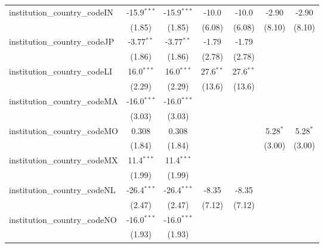 \begin{tabular}{lcccccc}
   institution\_country\_codeIN          & -15.9$^{***}$ & -15.9$^{***}$ & -10.0         & -10.0         & -2.90         & -2.90\\   
                                         & (1.85)        & (1.85)        & (6.08)        & (6.08)        & (8.10)        & (8.10)\\   
   institution\_country\_codeJP          & -3.77$^{**}$  & -3.77$^{**}$  & -1.79         & -1.79         &               &   \\   
                                         & (1.86)        & (1.86)        & (2.78)        & (2.78)        &               &   \\   
   institution\_country\_codeLI          & 16.0$^{***}$  & 16.0$^{***}$  & 27.6$^{**}$   & 27.6$^{**}$   &               &   \\   
                                         & (2.29)        & (2.29)        & (13.6)        & (13.6)        &               &   \\   
   institution\_country\_codeMA          & -16.0$^{***}$ & -16.0$^{***}$ &               &               &               &   \\   
                                         & (3.03)        & (3.03)        &               &               &               &   \\   
   institution\_country\_codeMO          & 0.308         & 0.308         &               &               & 5.28$^{*}$    & 5.28$^{*}$\\   
                                         & (1.84)        & (1.84)        &               &               & (3.00)        & (3.00)\\   
   institution\_country\_codeMX          & 11.4$^{***}$  & 11.4$^{***}$  &               &               &               &   \\   
                                         & (1.99)        & (1.99)        &               &               &               &   \\   
   institution\_country\_codeNL          & -26.4$^{***}$ & -26.4$^{***}$ & -8.35         & -8.35         &               &   \\   
                                         & (2.47)        & (2.47)        & (7.12)        & (7.12)        &               &   \\   
   institution\_country\_codeNO          & -16.0$^{***}$ & -16.0$^{***}$ &               &               &               &   \\   
                                         & (1.93)        & (1.93)        &               &               &               &   \\   

\end{tabular}
